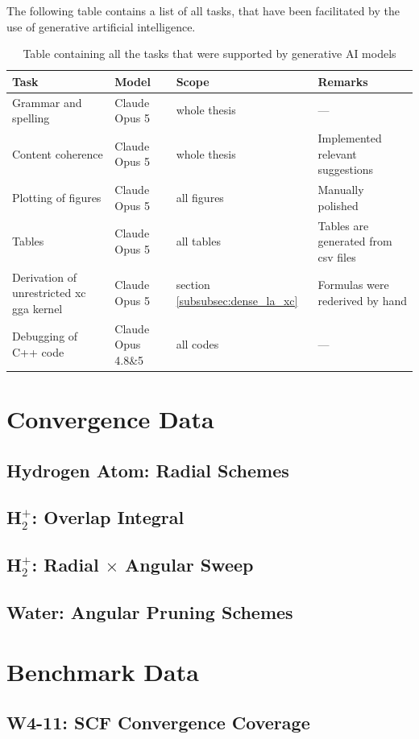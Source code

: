 \documentclass{article}
\begin{document}
The following table contains a list of all tasks, that have been
facilitated by the use of generative artificial intelligence.
\begin{table}[H]
  \centering
  {\small
    \begin{tabular}{@{}l l l l@{}}
      \toprule
      Task & Model & Scope & Remarks   \\
      \midrule
      Grammar and spelling  &  Claude Opus 5 &  whole thesis & --- \\
      Content coherence   &  Claude Opus 5 &  whole thesis &
      Implemented relevant suggestions \\
      Plotting of figures & Claude  Opus 5 & all figures &
      Manually polished \\
      Tables & Claude  Opus 5 & all tables & Tables are generated
      from csv files  \\
      Derivation of unrestricted xc gga kernel
      & Claude  Opus 5 & section \ref{subsubsec:dense_la_xc}  &
      Formulas were rederived by hand \\
      Debugging of C++ code & Claude Opus 4.8\&5 & all codes & --- \\
      \bottomrule
  \end{tabular}}
  \caption{Table containing all the tasks that were supported by
  generative AI models}
  \label{tab:ai_transparency}
\end{table}

\appendix

\section{Convergence Data}\label{app:convergence_data}

\subsection{Hydrogen Atom: Radial Schemes}


\subsection{H$_2^+$: Overlap Integral}


\subsection{H$_2^+$: Radial $\times$ Angular Sweep}



\subsection{Water: Angular Pruning Schemes}


\section{Benchmark Data}\label{app:benchmark_data}

\subsection{W4-11: SCF Convergence Coverage}






\end{document}
